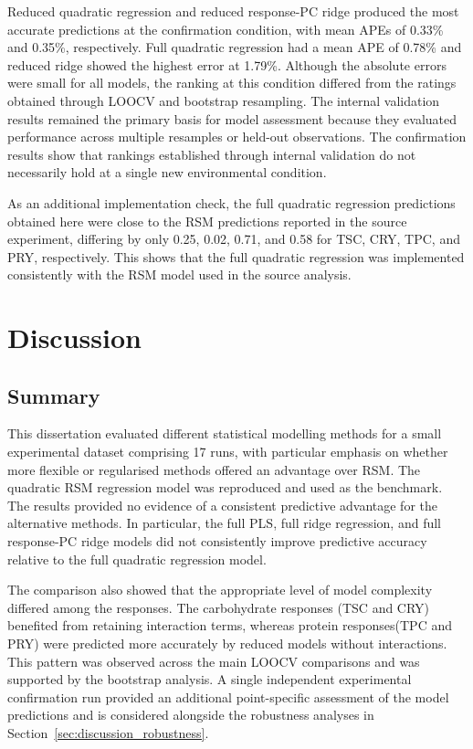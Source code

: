 \documentclass[MScDSA]{uccthesis}
\begin{document}
Reduced quadratic regression and reduced response-PC ridge produced the most accurate predictions at the confirmation condition, with mean APEs of 0.33\% and 0.35\%, respectively. Full quadratic regression had a mean APE of 0.78\% and reduced ridge showed the highest error at 1.79\%. Although the absolute errors were small for all models, the ranking at this condition differed from the ratings obtained through LOOCV and bootstrap resampling. The internal validation results remained the primary basis for model assessment because they evaluated performance across multiple resamples or held-out observations. The confirmation results show that rankings established through internal validation do not necessarily hold at a single new environmental condition.

As an additional implementation check, the full quadratic regression predictions obtained here were close to the RSM predictions reported in the source experiment, differing by only 0.25, 0.02, 0.71, and 0.58 for TSC, CRY, TPC, and PRY, respectively. This shows that the full quadratic regression was implemented consistently with the RSM model used in the source analysis.



\chapter{Discussion}
\section{Summary}
This dissertation evaluated different statistical modelling methods for a small experimental dataset comprising 17 runs, with particular emphasis on whether more flexible or regularised methods offered an advantage over RSM. The quadratic RSM regression model was reproduced and used as the benchmark. The results provided no evidence of a consistent predictive advantage for the alternative methods. In particular, the full PLS, full ridge regression, and full response-PC ridge models did not consistently improve predictive accuracy relative to the full quadratic regression model. 

The comparison also showed that the appropriate level of model complexity differed among the responses. The carbohydrate responses (TSC and CRY) benefited from retaining interaction terms, whereas protein responses(TPC and PRY) were predicted more accurately by reduced models without interactions. This pattern was observed across the main LOOCV comparisons and was supported by the bootstrap analysis. A single independent experimental confirmation run provided an additional point-specific assessment of the model predictions and is considered alongside the robustness analyses in Section~\ref{sec:discussion_robustness}.
\end{document}
